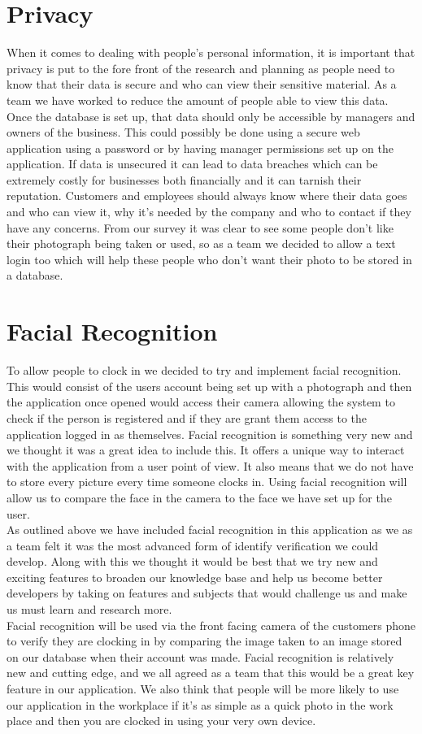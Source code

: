 \section{Privacy}
When it comes to dealing with people’s personal information, it is important that privacy is put to the fore front of the research and planning as people need to know that their data is secure and who can view their sensitive material. As a team we have worked to reduce the amount of people able to view this data. Once the database is set up, that data should only be accessible by managers and owners of the business. This could possibly be done using a secure web application using a password or by having manager permissions set up on the application.
If data is unsecured it can lead to data breaches which can be extremely costly for businesses both financially and it can tarnish their reputation. Customers and employees should always know where their data goes and who can view it, why it’s needed by the company and who to contact if they have any concerns. From our survey it was clear to see some people don’t like their photograph being taken or used, so as a team we decided to allow a text login too which will help these people who don’t want their photo to be stored in a database.
\\
\section{Facial Recognition}
To allow people to clock in we decided to try and implement facial recognition. This would consist of the users account being set up with a photograph and then the application once opened would access their camera allowing the system to check if the person is registered and if they are grant them access to the application logged in as themselves. Facial recognition is something very new and we thought it was a great idea to include this. It offers a unique way to interact with the application from a user point of view. It also means that we do not have to store every picture every time someone clocks in. Using facial recognition will allow us to compare the face in the camera to the face we have set up for the user.
\\
As outlined above we have included facial recognition in this application as we as a team felt it was the most advanced form of identify verification we could develop. Along with this we thought it would be best that we try new and exciting features to broaden our knowledge base and help us become better developers by taking on features and subjects that would challenge us and make us must learn and research more. 
\\
Facial recognition will be used via the front facing camera of the customers phone to verify they are clocking in by comparing the image taken to an image stored on our database when their account was made. Facial recognition is relatively new and cutting edge, and we all agreed as a team that this would be a great key feature in our application. We also think that people will be more likely to use our application in the workplace if it’s as simple as a quick photo in the work place and then you are clocked in using your very own device.
\\

